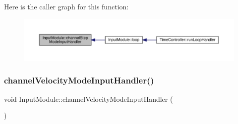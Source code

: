 Here is the caller graph for this function\+:
\nopagebreak
\begin{figure}[H]
\begin{center}
\leavevmode
\includegraphics[width=350pt]{class_input_module_ae5323fd937a03aff47a5696c67ca87d2_icgraph}
\end{center}
\end{figure}
\mbox{\label{class_input_module_a30c140bcc298b2c7c382ef290e77071f}} 
\subsubsection{\texorpdfstring{channel\+Velocity\+Mode\+Input\+Handler()}{channelVelocityModeInputHandler()}}
{\footnotesize\ttfamily void Input\+Module\+::channel\+Velocity\+Mode\+Input\+Handler (\begin{DoxyParamCaption}{ }\end{DoxyParamCaption})}

